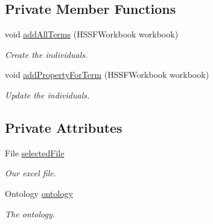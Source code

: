 \subsection*{Private Member Functions}
\begin{DoxyCompactItemize}
\item 
\hypertarget{class_excel_import_1_1_read_file_x_l_s_a37bedefb7738af3397dfeb5662cd5d13}{
void \hyperlink{class_excel_import_1_1_read_file_x_l_s_a37bedefb7738af3397dfeb5662cd5d13}{addAllTerms} (HSSFWorkbook workbook)}
\label{class_excel_import_1_1_read_file_x_l_s_a37bedefb7738af3397dfeb5662cd5d13}

\begin{DoxyCompactList}\small\item\em Create the individuals. \end{DoxyCompactList}\item 
\hypertarget{class_excel_import_1_1_read_file_x_l_s_a31bfc1904e15d6b5791d991426479c2a}{
void \hyperlink{class_excel_import_1_1_read_file_x_l_s_a31bfc1904e15d6b5791d991426479c2a}{addPropertyForTerm} (HSSFWorkbook workbook)}
\label{class_excel_import_1_1_read_file_x_l_s_a31bfc1904e15d6b5791d991426479c2a}

\begin{DoxyCompactList}\small\item\em Update the individuals. \end{DoxyCompactList}\end{DoxyCompactItemize}
\subsection*{Private Attributes}
\begin{DoxyCompactItemize}
\item 
\hypertarget{class_excel_import_1_1_read_file_x_l_s_a1828e678ccd6df307ff90249fc59a86c}{
File \hyperlink{class_excel_import_1_1_read_file_x_l_s_a1828e678ccd6df307ff90249fc59a86c}{selectedFile}}
\label{class_excel_import_1_1_read_file_x_l_s_a1828e678ccd6df307ff90249fc59a86c}

\begin{DoxyCompactList}\small\item\em Our excel file. \end{DoxyCompactList}\item 
\hypertarget{class_excel_import_1_1_read_file_x_l_s_a0d9350dfb8ef792fe23f8dd789beabf5}{
Ontology \hyperlink{class_excel_import_1_1_read_file_x_l_s_a0d9350dfb8ef792fe23f8dd789beabf5}{ontology}}
\label{class_excel_import_1_1_read_file_x_l_s_a0d9350dfb8ef792fe23f8dd789beabf5}

\begin{DoxyCompactList}\small\item\em The ontology. \end{DoxyCompactList}\end{DoxyCompactItemize}


